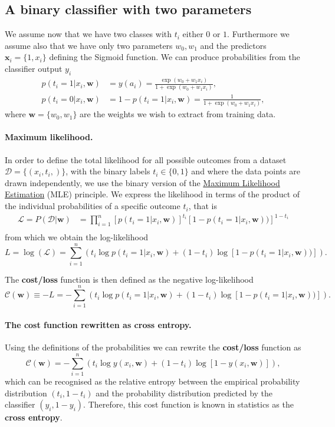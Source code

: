 \documentclass[%
oneside,                 %
final,                   %
10pt]{article}
\begin{document}
\subsection{A binary classifier with two parameters}

We assume now that we have two classes with $t_i$ either $0$ or $1$. Furthermore we assume also that we have only two parameters $w_0, w_1$ and the predictors $\boldsymbol{x}_i = \{ 1, x_i \}$ defining the Sigmoid function. We can produce probabilities from the classifier output $y_i$
\begin{align*}
p(t_i=1|x_i,\boldsymbol{w}) &= y(a_i)= \frac{\exp{(w_0+w_1x_i)}}{1+\exp{(w_0+w_1x_i)}},\\
p(t_i=0|x_i,\boldsymbol{w}) &= 1 - p(t_i=1|x_i,\boldsymbol{w}) = \frac{1}{1+\exp{(w_0+w_1x_i)}},
\end{align*}
where $\boldsymbol{w} = \{ w_0, w_1\}$ are the weights we wish to extract from training data. 

\paragraph{Maximum likelihood.}
In order to define the total likelihood for all possible outcomes from a  
dataset $\mathcal{D}=\{(x_i, t_i,)\}$, with the binary labels
$t_i\in\{0,1\}$ and where the data points are drawn independently, we use the binary version of the \href{{https://en.wikipedia.org/wiki/Maximum_likelihood_estimation}}{Maximum Likelihood Estimation} (MLE) principle. 
We express the 
likelihood in terms of the product of the individual probabilities of a specific outcome $t_i$, that is 
\begin{align*}
\mathcal{L} = P(\mathcal{D}|\boldsymbol{w})& = \prod_{i=1}^n \left[p(t_i=1|x_i,\boldsymbol{w})\right]^{t_i}\left[1-p(t_i=1|x_i,\boldsymbol{w}))\right]^{1-t_i}\nonumber \\
\end{align*}
from which we obtain the log-likelihood 
\[
L = \log(\mathcal{L}) = \sum_{i=1}^n \left( t_i\log{p(t_i=1|x_i,\boldsymbol{w})} + (1-t_i)\log\left[1-p(t_i=1|x_i,\boldsymbol{w}))\right]\right).
\]

The \textbf{cost/loss} function is then defined as the negative log-likelihood
\[
\mathcal{C}(\boldsymbol{w}) \equiv -L = -\sum_{i=1}^n \left( t_i\log{p(t_i=1|x_i,\boldsymbol{w})} + (1-t_i)\log\left[1-p(t_i=1|x_i,\boldsymbol{w}))\right]\right).
\]

\paragraph{The cost function rewritten as cross entropy.}
Using the definitions of the probabilities we can rewrite the \textbf{cost/loss} function as
\[
\mathcal{C}(\boldsymbol{w}) = -\sum_{i=1}^n \left( t_i\log{ y(x_i,\boldsymbol{w})} + (1-t_i)\log\left[ 1-y( x_i,\boldsymbol{w}) \right] \right),
\]
which can be recognised as the relative entropy between the empirical probability distribution $(t_i, 1-t_i)$ and the probability distribution predicted by the classifier $(y_i, 1-y_i)$.
Therefore, this cost function is known in statistics as the \textbf{cross entropy}. 
\end{document}
